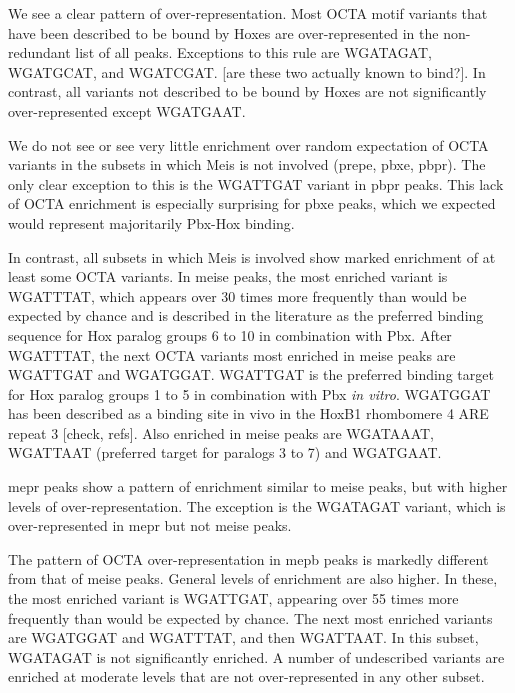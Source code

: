 We see a clear pattern of over-representation. Most \ac{OCTA} motif variants that have been described to be bound by Hoxes are over-represented in the non-redundant list of all peaks. Exceptions to this rule are WGATAGAT, WGATGCAT, and WGATCGAT. [are these two actually known to bind?]. In contrast, all variants not described to be bound by Hoxes are not significantly over-represented except WGATGAAT. %

We do not see or see very little enrichment over random expectation of \ac{OCTA} variants in the subsets in which Meis is not involved (\ac{prepe}, \ac{pbxe}, \ac{pbpr}). The only clear exception to this is the WGATTGAT variant in \ac{pbpr} peaks. This lack of \ac{OCTA} enrichment is especially surprising for \ac{pbxe} peaks, which we expected would represent majoritarily Pbx-Hox binding.

In contrast, all subsets in which Meis is involved show marked enrichment of at least some \ac{OCTA} variants. In \ac{meise} peaks, the most enriched variant is WGATTTAT, which appears over 30 times more frequently than would be expected by chance and is described in the literature as the preferred binding sequence for Hox paralog groups 6 to 10 in combination with Pbx. After WGATTTAT, the next \ac{OCTA} variants most enriched in \ac{meise} peaks are WGATTGAT and WGATGGAT. WGATTGAT is the preferred binding target for Hox paralog groups 1 to 5 in combination with Pbx \textit{in vitro}. WGATGGAT has been described as a binding site in vivo in the HoxB1 rhombomere 4 \ac{ARE} repeat 3 [check, refs]. Also enriched in \ac{meise} peaks are WGATAAAT, WGATTAAT (preferred target for paralogs 3 to 7) and WGATGAAT. 

\ac{mepr} peaks show a pattern of enrichment similar to \ac{meise} peaks, but with higher levels of over-representation. The exception is the WGATAGAT variant, which is over-represented in \ac{mepr} but not \ac{meise} peaks. 

The pattern of \ac{OCTA} over-representation in \ac{mepb} peaks is markedly different from that of \ac{meise} peaks. General levels of enrichment are also higher. In these, the most enriched variant is WGATTGAT, appearing over 55 times more frequently than would be expected by chance. The next most enriched variants are WGATGGAT and WGATTTAT, and then WGATTAAT. In this subset, WGATAGAT is not significantly enriched. A number of undescribed variants are enriched at moderate levels that are not over-represented in any other subset. 


